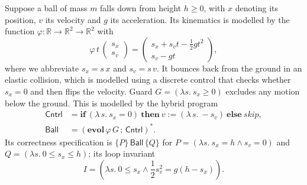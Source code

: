 \documentclass[envcountsame,envcountsect]{llncs}
\newcommand{\IF}[3]{\mathbf{if}\ #1\ \mathbf{then}\ #2\ \mathbf{else}\ #3}
\newcommand{\flow}{\varphi}
\newcommand{\reals}{\mathbb{R}}
\begin{document}
\begin{example}\label{ex:ball-hoare}
  Suppose a ball of mass $m$ falls down from height $h\geq 0$, with
  $x$ denoting its position, $v$ its velocity and $g$ its
  acceleration. Its kinematics is modelled by the function
  $\flow:\reals\to\reals^2\to\reals^2$ with
 \begin{equation*}
    \flow\, t\,
    \begin{pmatrix}
      s_x\\
      s_v
    \end{pmatrix}
=
\begin{pmatrix}
  s_x+s_v t-\frac{1}{2}gt^2\\
 s_v-g t
\end{pmatrix},
\end{equation*}
where we abbreviate
$s_x = s\, x$ and $s_v = s\, v$.  It bounces back
from the ground in an elastic collision, which is modelled using a
discrete control that checks whether $s_x=0$ and then flips the
velocity.  Guard $G=(\lambda s.\ s_x\geq 0)$ excludes any motion
below the ground. This is modelled by the hybrid
program~\cite{Platzer18}
\begin{align*}
	\mathsf{Cntrl} &= \IF {(\lambda\, s.\ s_x=0)} {v:=(\lambda\, s.\ - s_v)} \mathit{skip},\\
	\mathsf{Ball} &= ({\mathbf{evol}\, \flow\, G}\,  {;}\, \mathsf{Cntrl})^\ast.
\end{align*}
Its correctness specification is $\{P\}\, \mathsf{Ball}\, \{Q\}$ for $P= (\lambda s.\ s_x = h\land s_v = 0)$ and $Q  = (\lambda s.\ 0\leq s_x\leq h)$; its loop invariant
\begin{equation*}
      I = \left(\lambda s.\ 0\le s_x \land \frac{1}{2}s_v^2= g(h - s_x)\right).
\end{equation*}


\end{example}
\end{document}
